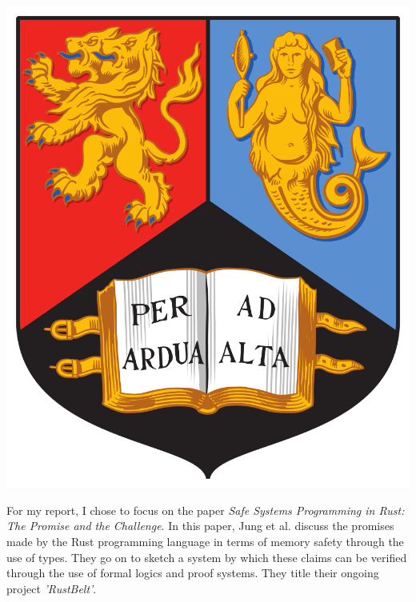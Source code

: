 \documentclass[11pt]{article}
\begin{document}
\begin{minipage}{0.5\textwidth}\begin{flushright}	%
\includegraphics[scale = 0.06]{Resources/UoB}		%
\hspace*{20px}										%
\end{flushright}\end{minipage}						%
\vspace{20px}										%
\hfuzz=3pt                                          %

For my report, I chose to focus on the paper \textit{Safe Systems Programming in Rust: The Promise and the Challenge}\cite{jungSafeSystemsProgramming2020}. In this paper, Jung et al. discuss the promises made by the Rust programming language in terms of memory safety through the use of types. They go on to sketch a system by which these claims can be verified through the use of formal logics and proof systems. They title their ongoing project \textit{'RustBelt'}\cite{RustBelt}.
\end{document}
